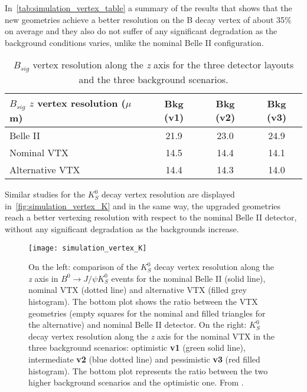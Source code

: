 In~\autoref{tab:simulation_vertex_table} a summary of the results that shows that the new geometries achieve a better resolution on the B decay vertex of about 35\% on average and they also do not suffer of any significant degradation as the background conditions varies, unlike the nominal Belle II configuration.

\begin{table}[htbp]
  \begin{center}
    \begin{tabular}{l|c|c|c}
      \hline\hline
      $B_{sig}$ $z$ vertex resolution ($\mu$m) & Bkg (v1) & Bkg (v2) & Bkg (v3) \\
      \hline\hline
      Belle II & 21.9 & 23.0 & 24.9 \\
      \hline
      Nominal VTX & 14.5 & 14.4 & 14.1 \\
      \hline
      Alternative VTX & 14.4 & 14.3 & 14.0 \\
      \hline\hline
    \end{tabular}
  \end{center}
\caption{$B_{sig}$ vertex resolution along the \textit{z} axis for the three detector layouts and the three background scenarios.}
\label{tab:simulation_vertex_table}
\end{table}


Similar studies for the $K_{S}^{0}$ decay vertex resolution are displayed in~\autoref{fig:simulation_vertex_K} and in the same way, the upgraded geometries reach a better vertexing resolution with respect to the nominal Belle II detector, without any significant degradation as the backgrounds increase.

\begin{figure}[h!]
\centering
\texttt{[image: simulation\_vertex\_K]}
\caption{On the left: comparison of the $K_{S}^{0}$ decay vertex resolution along the \textit{z} axis in $B^{0} \rightarrow J/\psi K_{S}^{0}$ events for the nominal Belle II (solid line), nominal VTX (dotted line) and alternative VTX (filled grey histogram). The bottom plot shows the ratio between the VTX geometries (empty squares for the nominal and filled triangles for the alternative) and nominal Belle II detector. 
On the right: $K_{S}^{0}$ decay vertex resolution along the \textit{z} axis for the nominal VTX in the three background scenarios: optimistic \textbf{v1} (green solid line), intermediate \textbf{v2} (blue dotted line) and pessimistic \textbf{v3} (red filled histogram). The bottom plot represents the ratio between the two higher background scenarios and the optimistic one. From \cite{F.Forti:3930}.}
\label{fig:simulation_vertex_K}
\end{figure}

